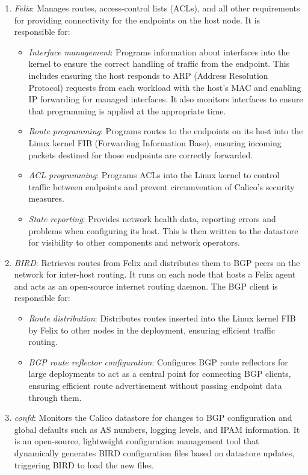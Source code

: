 \begin{enumerate}
  \itemsep0em
  \item \textit{Felix}: Manages routes, access-control lists (ACLs), and all
    other requirements for providing connectivity for the endpoints on the host
    node. It is responsible for:
    \begin{itemize}
      \itemsep0em
      \item \textit{Interface management}: Programs information about interfaces
        into the kernel to ensure the correct handling of traffic from the
        endpoint. This includes ensuring the host responds to ARP (Address
        Resolution Protocol) requests from each workload with the host's MAC and
        enabling IP forwarding for managed interfaces.
        It also monitors interfaces to ensure that programming is applied at the
        appropriate time.
      \item \textit{Route programming}: Programs routes to the endpoints on its
        host into the Linux kernel FIB (Forwarding Information Base), ensuring
        incoming packets destined for those endpoints are correctly forwarded.
      \item \textit{ACL programming}: Programs ACLs into the Linux kernel to
        control traffic between endpoints and prevent circumvention of Calico's
        security measures.
      \item \textit{State reporting}: Provides network health data, reporting
        errors and problems when configuring its host. This is then written to
        the datastore for visibility to other components and network operators.
    \end{itemize}
  \item \textit{BIRD}: Retrieves routes from Felix and distributes them to BGP
    peers on the network for inter-host routing. It runs on each node that hosts
    a Felix agent and acts as an open-source internet routing daemon. The BGP
    client is responsible for:
    \begin{itemize}
      \itemsep0em
      \item \textit{Route distribution}: Distributes routes inserted into the
        Linux kernel FIB by Felix to other nodes in the deployment, ensuring
        efficient traffic routing.
      \item \textit{BGP route reflector configuration}: Configures BGP route
        reflectors for large deployments to act as a central point for
        connecting BGP clients, ensuring efficient route advertisement without
        passing endpoint data through them.
    \end{itemize}
  \item \textit{confd}: Monitors the Calico datastore for changes to BGP
    configuration and global defaults such as AS numbers, logging levels, and
    IPAM information. It is an open-source, lightweight configuration
    management tool that dynamically generates BIRD configuration files based on
    datastore updates, triggering BIRD to load the new files.
\end{enumerate}



